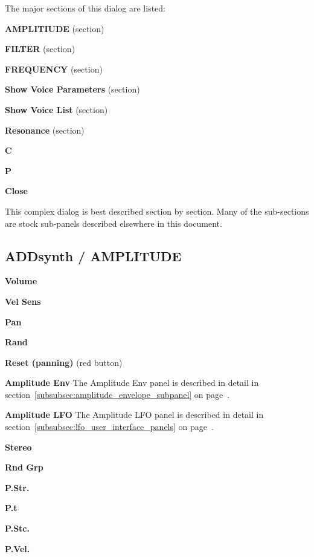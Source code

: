    The major sections of this dialog are listed:

   \begin{enumber}
      \item \textbf{AMPLITIUDE} (section)
      \item \textbf{FILTER} (section)
      \item \textbf{FREQUENCY} (section)
      \item \textbf{Show Voice Parameters} (section)
      \item \textbf{Show Voice List} (section)
      \item \textbf{Resonance} (section)
      \item \textbf{C}
      \item \textbf{P}
      \item \textbf{Close}
   \end{enumber}

This complex dialog is best described section by section.
Many of the sub-sections are stock sub-panels described elsewhere
in this document.

\subsection{ADDsynth / AMPLITUDE}
\label{subsec:addsynth_amplitude}

   \begin{enumber}
      \item \textbf{Volume}
      \item \textbf{Vel Sens}
      \item \textbf{Pan}
      \item \textbf{Rand}
      \item \textbf{Reset (panning)} (red button)
      \item \textbf{Amplitude Env}
         The Amplitude Env panel is described in detail in
         section~\ref{subsubsec:amplitude_envelope_subpanel} on
         page~\pageref{subsubsec:amplitude_envelope_subpanel}.
      \item \textbf{Amplitude LFO}
         The Amplitude LFO panel is described in detail in
         section~\ref{subsubsec:lfo_user_interface_panels} on
         page~\pageref{subsubsec:lfo_user_interface_panels}.
      \item \textbf{Stereo}
      \item \textbf{Rnd Grp}
      \item \textbf{P.Str.}
      \item \textbf{P.t}
      \item \textbf{P.Stc.}
      \item \textbf{P.Vel.}
   \end{enumber}

